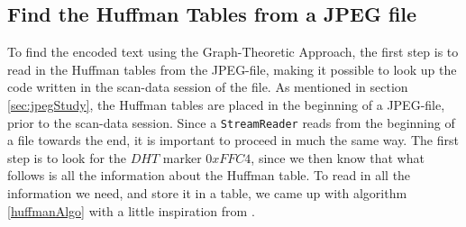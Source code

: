 \subsection{Find the Huffman Tables from a JPEG file}
\label{sec:DesignHuffman}
To find the encoded text using the Graph-Theoretic Approach, the first step is to read in the Huffman tables from the JPEG-file, making it possible to look up the code written in the scan-data session of the file.
As mentioned in section \ref{sec:jpegStudy}, the Huffman tables are placed in the beginning of a JPEG-file, prior to the scan-data session.
Since a \lstinline|StreamReader| reads from the beginning of a file towards the end, it is important to proceed in much the same way.
The first step is to look for the $DHT$ marker $0xFFC4$, since we then know that what follows is all the information about the Huffman table.
To read in all the information we need, and store it in a table, we came up with algorithm \ref{huffmanAlgo} with a little inspiration from \cite{HuffmanDecoding}.

